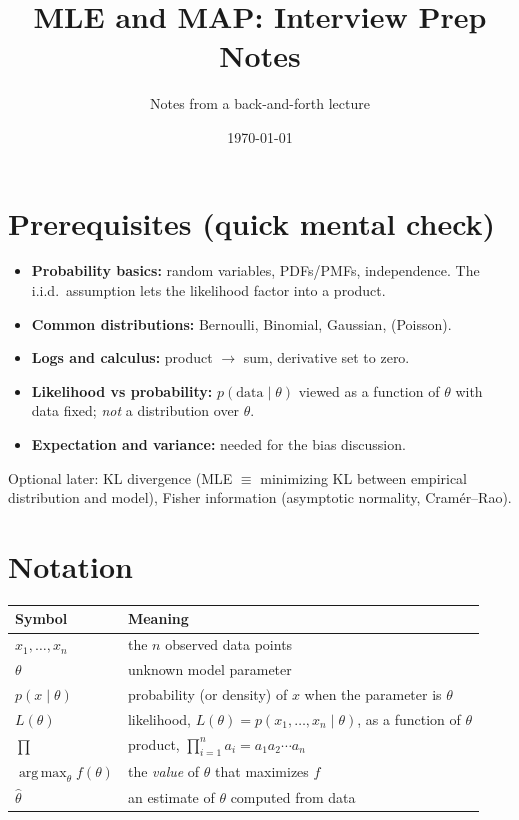 \documentclass[11pt,a4paper]{article}
\title{MLE and MAP: Interview Prep Notes}
\author{Notes from a back-and-forth lecture}
\date{\today}
\DeclareMathOperator*{\argmax}{arg\,max}
\begin{document}
\maketitle
\tableofcontents
\newpage

\section{Prerequisites (quick mental check)}
\begin{itemize}[nosep]
  \item \textbf{Probability basics:} random variables, PDFs/PMFs, independence. The i.i.d.\ assumption lets the likelihood factor into a product.
  \item \textbf{Common distributions:} Bernoulli, Binomial, Gaussian, (Poisson).
  \item \textbf{Logs and calculus:} product $\to$ sum, derivative set to zero.
  \item \textbf{Likelihood vs probability:} $p(\text{data}\mid\theta)$ viewed as a function of $\theta$ with data fixed; \emph{not} a distribution over $\theta$.
  \item \textbf{Expectation and variance:} needed for the bias discussion.
\end{itemize}
Optional later: KL divergence (MLE $\equiv$ minimizing KL between empirical distribution and model), Fisher information (asymptotic normality, Cram\'er--Rao).

\section{Notation}
\begin{center}
\begin{tabular}{@{}ll@{}}
\toprule
Symbol & Meaning \\
\midrule
$x_1,\dots,x_n$ & the $n$ observed data points \\
$\theta$ & unknown model parameter \\
$p(x\mid\theta)$ & probability (or density) of $x$ when the parameter is $\theta$ \\
$L(\theta)$ & likelihood, $L(\theta)=p(x_1,\dots,x_n\mid\theta)$, as a function of $\theta$ \\
$\prod$ & product, $\prod_{i=1}^n a_i = a_1 a_2\cdots a_n$ \\
$\argmax_\theta f(\theta)$ & the \emph{value} of $\theta$ that maximizes $f$ \\
$\hat\theta$ & an estimate of $\theta$ computed from data \\
\bottomrule
\end{tabular}
\end{center}
\end{document}
